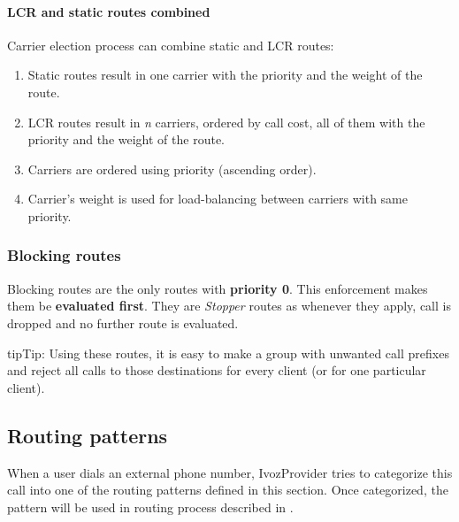 \documentclass[letterpaper,10pt,english]{sphinxmanual}
\begin{document}
\paragraph{LCR and static routes combined}
\label{administration_portal/brand/routing/outgoing_routings:lcr-and-static-routes-combined}
Carrier election process can combine static and LCR routes:
\begin{enumerate}
\item {} 
Static routes result in one carrier with the priority and the weight of the route.

\item {} 
LCR routes result in \emph{n} carriers, ordered by call cost, all of them with the priority and the weight of the route.

\item {} 
Carriers are ordered using priority (ascending order).

\item {} 
Carrier's weight is used for load-balancing between carriers with same priority.

\end{enumerate}


\subsubsection{Blocking routes}
\label{administration_portal/brand/routing/outgoing_routings:blocking-routes}
Blocking routes are the only routes with \textbf{priority 0}. This enforcement makes them be \textbf{evaluated first}. They are
\emph{Stopper} routes as whenever they apply, call is dropped and no further route is evaluated.

\begin{notice}{tip}{Tip:}
Using these routes, it is easy to make a group with unwanted call prefixes and reject all calls to those
destinations for every client (or for one particular client).
\end{notice}


\subsection{Routing patterns}
\label{administration_portal/brand/routing/routing_patterns::doc}\label{administration_portal/brand/routing/routing_patterns:routing-patterns}\label{administration_portal/brand/routing/routing_patterns:id1}
When a user dials an external phone number, IvozProvider tries to categorize
this call into one of the routing patterns defined in this section. Once categorized,
the pattern will be used in routing process described in {\hyperref[administration_portal/brand/routing/outgoing_routings:outgoing\string-routings]{}}.
\end{document}
